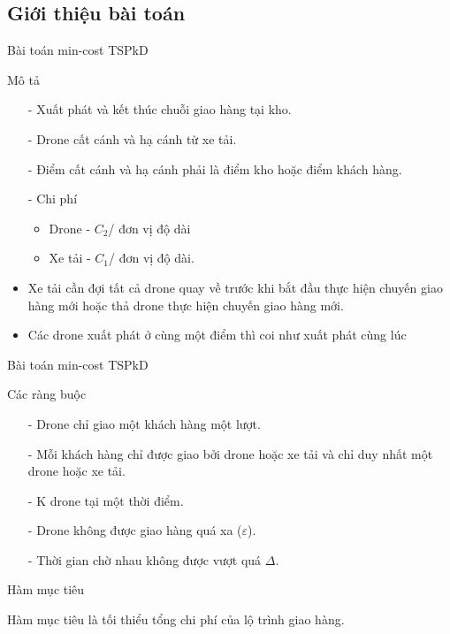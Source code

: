 \documentclass[compress]{beamer}
\begin{document}
\subsection{Giới thiệu bài toán}
\begin{frame}{Bài toán min-cost TSPkD}
\begin{block}{Mô tả}
\begin{itemize}
\item[-] Xuất phát và kết thúc chuỗi giao hàng tại kho.
\item[-] Drone cất cánh và hạ cánh từ xe tải.
\item[-] Điểm cất cánh và hạ cánh phải là điểm kho hoặc điểm khách hàng.
\item[-] Chi phí \begin{itemize}
\item Drone - $C_2$/ đơn vị độ dài
\item Xe tải - $C_1$/ đơn vị độ dài.
\end{itemize}
\item Xe tải cần đợi tất cả drone quay về trước khi bắt đầu thực hiện chuyến giao hàng mới hoặc thả drone thực hiện chuyến giao hàng mới.
\item Các drone xuất phát ở cùng một điểm thì coi như xuất phát cùng lúc
\end{itemize}
\end{block}
\end{frame}
\begin{frame}{Bài toán min-cost TSPkD}


\begin{block}{Các ràng buộc}
\begin{itemize}

\item[-] Drone chỉ giao một khách hàng một lượt.
\item[-] Mỗi khách hàng chỉ được giao bởi drone hoặc xe tải và chỉ duy nhất một drone hoặc xe tải.
\item[-] K drone tại một thời điểm.
\item[-] Drone không được giao hàng quá xa ($\varepsilon$).
\item[-] Thời gian chờ nhau không được vượt quá $\Delta$.


\end{itemize}
\end{block}

\begin{block}{Hàm mục tiêu}

Hàm mục tiêu là tối thiểu tổng chi phí của lộ trình giao hàng.
\end{block}
\end{frame}
\end{document}
